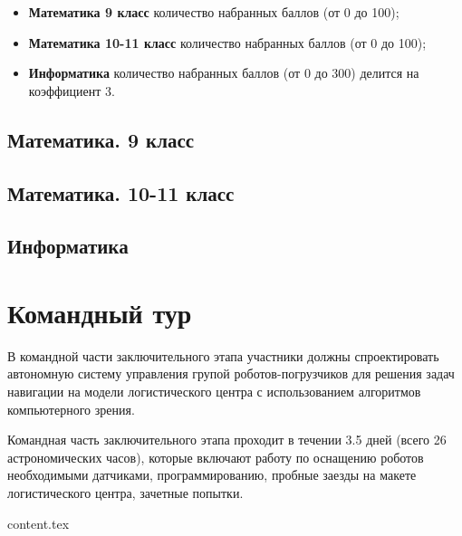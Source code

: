 \documentclass[a4paper,12pt,oneside]{book}
\begin{document}
\begin{itemize}
    \item {\bf Математика 9 класс} количество набранных баллов
    (от 0 до 100);
    \item {\bf Математика 10-11 класс} количество набранных баллов
    (от 0 до 100);
    \item {\bf Информатика} количество набранных баллов (от 0 до
    300) делится на коэффициент 3.
\end{itemize}

\section{Математика. 9 класс}


\section{Математика. 10-11 класс}


\section{Информатика}


\chapter{Командный тур}

В командной части заключительного этапа участники должны
спроектировать автономную систему управления групой роботов-погрузчиков
для решения задач навигации на модели логистического центра с
использованием алгоритмов компьютерного зрения.

Командная часть заключительного этапа проходит в течении
3.5 дней (всего 26 астрономических часов), которые включают работу по
оснащению роботов необходимыми датчиками, программированию, пробные заезды
на макете логистического центра, зачетные попытки.

{content.tex}


\end{document}
